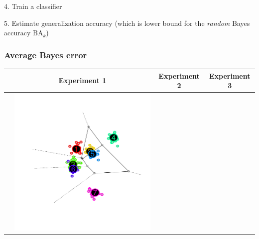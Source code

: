 \documentclass{beamer}
\begin{document}
\begin{frame}
\vspace{0.2in}
4. Train a classifier

\vspace{0.2in}
5. Estimate generalization accuracy (which is lower bound for the \emph{random} Bayes accuracy $\text{BA}_k$)
\end{frame}

\begin{frame}
\frametitle{Average Bayes error}
\begin{center}
\begin{tabular}{c|c|c|c}
& Experiment 1 & Experiment 2 & Experiment 3\\\hline
&\includegraphics[scale = 0.15, clip = true, trim = 0.6in 0.2in 0.6in 0.2in]{../info_theory_paper/gaussian_figure1a.png} &

\end{tabular}
\end{center}
\end{frame}
\end{document}
